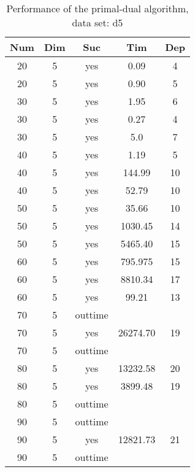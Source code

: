 \begin{table}[!htb]
  \centering
  \begin{tabular}[center]{|c|c|c|c|c|}
    \hline
    Num & Dim & Suc & Tim & Dep \\
    \hline
    20 & 5 & yes & 0.09 & 4 \\
    20 & 5 & yes & 0.90 & 5 \\
    30 & 5 & yes & 1.95 & 6 \\
    30 & 5 & yes & 0.27 & 4 \\
    30 & 5 & yes & 5.0 & 7 \\
    40 & 5 & yes & 1.19 & 5 \\
    40 & 5 & yes & 144.99 & 10 \\
    40 & 5 & yes & 52.79 & 10 \\
    50 & 5 & yes & 35.66 & 10 \\
    50 & 5 & yes & 1030.45 & 14 \\
    50 & 5 & yes & 5465.40 & 15 \\
    60 & 5 & yes & 795.975 & 15 \\
    60 & 5 & yes & 8810.34 & 17 \\
    60 & 5 & yes & 99.21 & 13 \\
    70 & 5 & outtime &&\\
    70 & 5 & yes & 26274.70 & 19 \\
    70 & 5 & outtime &&\\
    80 & 5 & yes & 13232.58 & 20 \\
    80 & 5 & yes & 3899.48 & 19 \\
    80 & 5 & outtime &&\\
    90 & 5 & outtime &&\\
    90 & 5 & yes & 12821.73 & 21 \\
    90 & 5 & outtime &&\\
    \hline
  \end{tabular}
  \caption{Performance of the primal-dual algorithm, data set: d5}
  \label{tab:test.pd-d5}
\end{table}

